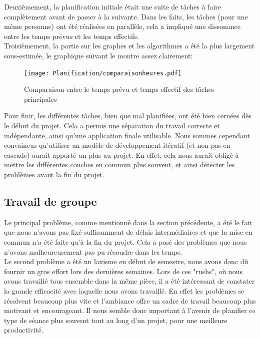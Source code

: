 \documentclass[french]{article}
\begin{document}
		Deuxièmement, la planification initiale était une suite de tâches à faire complètement avant de passer à la suivante. Dans les faits, les tâches (pour une même personne) ont été réalisées en parallèle, cela a impliqué une dissonance entre les temps prévus et les temps effectifs.\\
		
		Troisièmement, la partie sur les graphes et les algorithmes a été la plus largement sous-estimée, le graphique suivant le montre assez clairement:
		\begin{figure}[H]
			\texttt{[image: Planification/comparaisonheures.pdf]}
			\caption{Comparaison entre le temps prévu et temps effectif des tâches
				principales}
			\label{fig:comparaisonheures}
		\end{figure}
		
		Pour finir, les différentes tâches, bien que mal planifiées, ont été bien cernées dès le début du projet. Cela a permis une séparation du travail correcte et indépendante, ainsi qu'une application finale utilisable. Nous sommes cependant convaincus qu'utiliser un modèle de développement itératif (et non pas en cascade) aurait apporté un plus au projet. En effet, cela nous aurait obligé à mettre les différentes couches en commun plus souvent, et ainsi détecter les problèmes avant la fin du projet. 
		
		\subsection{Travail de groupe}
		Le principal problème, comme mentionné dans la section précédente, a été le fait que nous n'avons pas fixé suffisamment de délais intermédiaires et que la mise en commun n'a été faite qu'à la fin du projet. Cela a posé des problèmes que nous n'avons malheureusement pas pu résoudre dans les temps.\\
		
		Le second problème a été un laxisme en début de semestre, nous avons donc dû fournir un gros effort lors des dernières semaines. Lors de ces "rushs", où nous avons travaillé tous ensemble dans la même pièce, il a été intéressant de constater la grande efficacité avec laquelle nous avons travaillé. En effet les problèmes se résolvent beaucoup plus vite et l'ambiance offre un cadre de travail beaucoup plus motivant et encourageant. Il nous semble donc important à l'avenir de planifier ce type de séance plus souvent tout au long d'un projet, pour une meilleure productivité.\\
		
\end{document}
